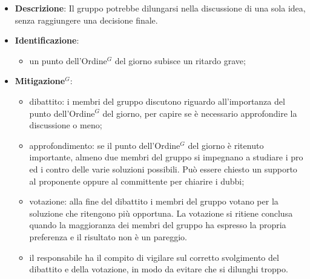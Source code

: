\label{risk:conflitti decisionali}
\begin{itemize}
	\item \textbf{Descrizione}:
	      Il gruppo potrebbe dilungarsi nella discussione di una sola idea, senza
	      raggiungere una decisione finale.
	\item \textbf{Identificazione}:
	      \begin{itemize}
		      \item un punto dell'\gls{Ordine}$^G$ del giorno subisce un ritardo grave;
	      \end{itemize}
	\item \textbf{\gls{Mitigazione}$^G$}:
	      \begin{itemize}
		      \item dibattito: i membri del gruppo discutono riguardo
		            all'importanza del punto dell'\gls{Ordine}$^G$ del giorno, per capire se
		            è necessario approfondire la discussione o meno;

		      \item approfondimento: se il punto dell'\gls{Ordine}$^G$ del giorno è
		            ritenuto importante, almeno due membri del gruppo si impegnano
		            a studiare i pro ed i contro delle varie soluzioni possibili.
		            Può essere chiesto un supporto al proponente oppure al
		            committente per chiarire i dubbi;

		      \item votazione: alla fine del dibattito i membri del gruppo
		            votano per la soluzione che ritengono più opportuna. La
		            votazione si ritiene conclusa quando la maggioranza dei
		            membri del gruppo ha espresso la propria preferenza e il
		            risultato non è un pareggio.

		      \item il responsabile ha il compito di vigilare sul corretto
		            svolgimento del dibattito e della votazione, in modo da
		            evitare che si dilunghi troppo.
	      \end{itemize}
\end{itemize}
